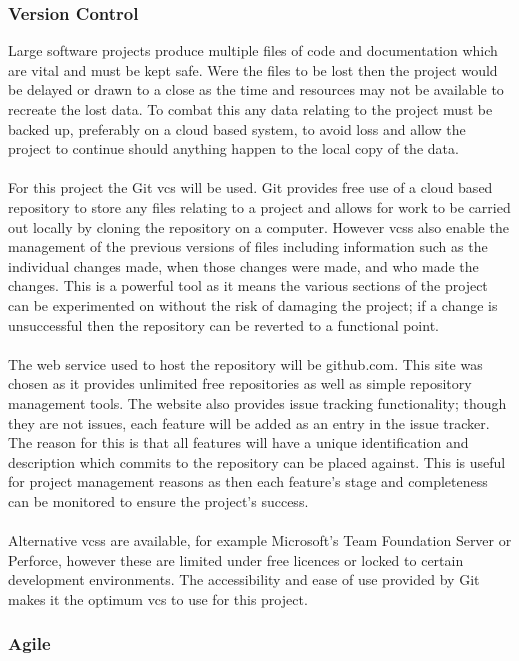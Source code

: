 	\subsubsection{Version Control}
		Large software projects produce multiple files of code and documentation which are vital and must be kept safe. Were the files to be lost then the project would be delayed or drawn to a close as the time and resources may not be available to recreate the lost data. To combat this any data relating to the project must be backed up, preferably on a cloud based system, to avoid loss and allow the project to continue should anything happen to the local copy of the data.
		\\\\
		For this project the Git \gls{vcs} will be used. Git provides free use of a cloud based repository to store any files relating to a project and allows for work to be carried out locally by cloning the repository on a computer. However \glspl{vcs} also enable the management of the previous versions of files including information such as the individual changes made, when those changes were made, and who made the changes. This is a powerful tool as it means the various sections of the project can be experimented on without the risk of damaging the project; if a change is unsuccessful then the repository can be reverted to a functional point.
		\\\\
		The web service used to host the repository will be github.com. This site was chosen as it provides unlimited free repositories as well as simple repository management tools. The website also provides issue tracking functionality; though they are not issues, each feature will be added as an entry in the issue tracker. The reason for this is that all features will have a unique identification and description which commits to the repository can be placed against. This is useful for project management reasons as then each feature's stage and completeness can be monitored to ensure the project's success.
		\\\\
		Alternative \glspl{vcs} are available, for example Microsoft's Team Foundation Server or Perforce, however these are limited under free licences or locked to certain development environments. The accessibility and ease of use provided by Git makes it the optimum \gls{vcs} to use for this project. 
	\subsubsection{Agile}
